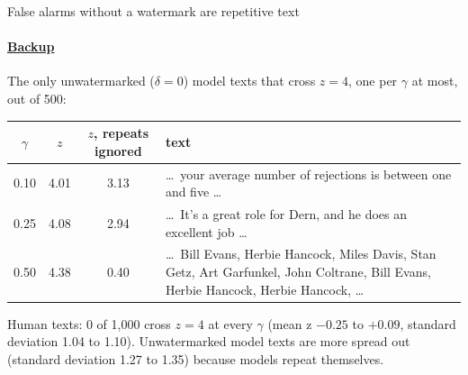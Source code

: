 \documentclass[aspectratio=169,10pt,t]{beamer}
\begin{document}
\begin{frame}[label=b11]{False alarms without a watermark are repetitive text}
  \framesubtitle{\hyperlink{b0}{Backup}}
  \small
  The only unwatermarked ($\delta = 0$) model texts that cross $z = 4$, one per $\gamma$ at most, out of 500:\par\vspace{0.3em}
  \begin{center}
  \begin{tabular}{@{}cccp{}@{}}
    \toprule
    $\gamma$ & $z$ & $z$, repeats ignored & text \\
    \midrule
    0.10 & 4.01 & 3.13 & \raggedright \ldots\ your average number of rejections is between one and five \ldots \tabularnewline
    0.25 & 4.08 & 2.94 & \raggedright \ldots\ It's a great role for Dern, and he does an excellent job \ldots \tabularnewline
    0.50 & 4.38 & 0.40 & \raggedright \ldots\ Bill Evans, Herbie Hancock, Miles Davis, Stan Getz, Art Garfunkel, John Coltrane, Bill Evans, Herbie Hancock, Herbie Hancock, \ldots \tabularnewline
    \bottomrule
  \end{tabular}
  \end{center}
  \vspace{0.3em}
  Human texts: 0 of 1{,}000 cross $z = 4$ at every $\gamma$ (mean z $-0.25$ to $+0.09$, standard deviation 1.04 to 1.10). Unwatermarked model texts are more spread out (standard deviation 1.27 to 1.35) because models repeat themselves.
\end{frame}
\end{document}
